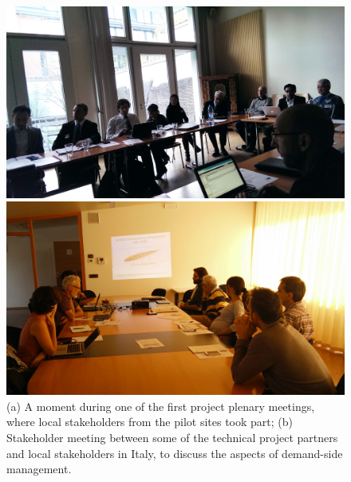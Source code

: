
%
\begin{figure}
      \begin{center}
        \begin{minipage}[htb]{0.45\linewidth}    
        \includegraphics[width=1\linewidth]{img/Stkh_plenary1.jpg}
        \end{minipage}
 	\hfill 
         \begin{minipage}[htb]{0.45\linewidth}    
	        \includegraphics[width=1\linewidth]{img/Stkh_meeting_tou_crop.jpg} 
                \end{minipage}
      \end{center}
    \caption{(a) A moment during one of the first project plenary meetings, where local stakeholders from the pilot sites took part; (b) Stakeholder meeting between some of the technical project partners and
    local stakeholders in Italy, to discuss the aspects of demand-side management.
}
\label{fig:stkh_meetings}
\end{figure}
%

